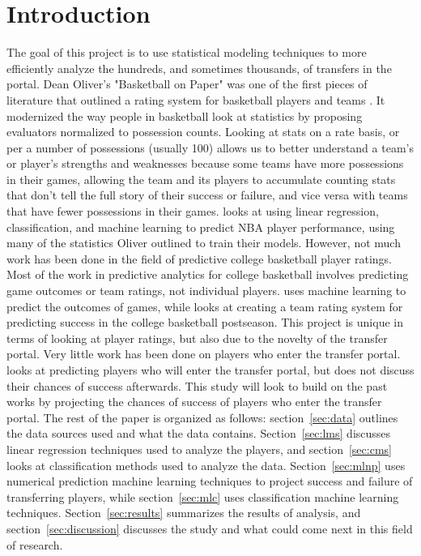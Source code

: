 \documentclass[12pt]{article}
\begin{document}
\section{Introduction}
The goal of this project is to use statistical modeling techniques to more efficiently analyze the hundreds, and sometimes thousands, of transfers in the portal. Dean Oliver's "Basketball on Paper" was one of the first pieces of literature that outlined a rating system for basketball players and teams \citep[][]{oliver2004basketball}. It modernized the way people in basketball look at statistics by proposing evaluators normalized to possession counts. Looking at stats on a rate basis, or per a number of possessions (usually 100) allows us to better understand a team's or player's strengths and weaknesses because some teams have more possessions in their games, allowing the team and its players to accumulate counting stats that don't tell the full story of their success or failure, and vice versa with teams that have fewer possessions in their games. \citet{nguyen2022application} looks at using linear regression, classification, and machine learning to predict NBA player performance, using many of the statistics Oliver outlined to train their models. However, not much work has been done in the field of predictive college basketball player ratings. Most of the work in predictive analytics for college basketball involves predicting game outcomes or team ratings, not individual players. \citet{zimmermann2013predicting} uses machine learning to predict the outcomes of games, while \citet{west2006simple} looks at creating a team rating system for predicting success in the college basketball postseason. This project is unique in terms of looking at player ratings, but also due to the novelty of the transfer portal. Very little work has been done on players who enter the transfer portal. \citet{davis2023exploratory} looks at predicting players who will enter the transfer portal, but does not discuss their chances of success afterwards. This study will look to build on the past works by projecting the chances of success of players who enter the transfer portal. The rest of the paper is organized as follows: section~\ref{sec:data} outlines the data sources used and what the data contains. Section~\ref{sec:lms} discusses linear regression techniques used to analyze the players, and section~\ref{sec:cms} looks at classification methods used to analyze the data. Section~\ref{sec:mlnp} uses numerical prediction machine learning techniques to project success and failure of transferring players, while section~\ref{sec:mlc} uses classification machine learning techniques. Section~\ref{sec:results} summarizes the results of analysis, and section~\ref{sec:discussion} discusses the study and what could come next in this field of research.
\end{document}
